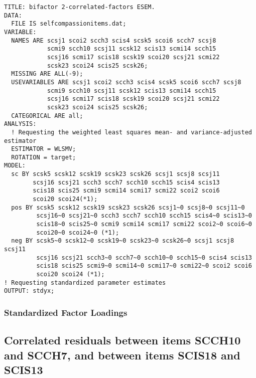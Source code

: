 \documentclass[aps,floatfix,prl]{revtex4}
\begin{document}
\begin{verbatim}
TITLE: bifactor 2-correlated-factors ESEM.
DATA:
  FILE IS selfcompassionitems.dat;
VARIABLE:
  NAMES ARE scsj1 scoi2 scch3 scis4 scsk5 scoi6 scch7 scsj8
            scmi9 scch10 scsj11 scsk12 scis13 scmi14 scch15
            scsj16 scmi17 scis18 scsk19 scoi20 scsj21 scmi22
            scsk23 scoi24 scis25 scsk26;
  MISSING ARE ALL(-9);
  USEVARIABLES ARE scsj1 scoi2 scch3 scis4 scsk5 scoi6 scch7 scsj8
            scmi9 scch10 scsj11 scsk12 scis13 scmi14 scch15
            scsj16 scmi17 scis18 scsk19 scoi20 scsj21 scmi22
            scsk23 scoi24 scis25 scsk26;
  CATEGORICAL ARE all;
ANALYSIS:
  ! Requesting the weighted least squares mean- and variance-adjusted estimator
  ESTIMATOR = WLSMV;
  ROTATION = target;
MODEL:
  sc BY scsk5 scsk12 scsk19 scsk23 scsk26 scsj1 scsj8 scsj11
        scsj16 scsj21 scch3 scch7 scch10 scch15 scis4 scis13
        scis18 scis25 scmi9 scmi14 scmi17 scmi22 scoi2 scoi6
        scoi20 scoi24(*1);
  pos BY scsk5 scsk12 scsk19 scsk23 scsk26 scsj1~0 scsj8~0 scsj11~0
         scsj16~0 scsj21~0 scch3 scch7 scch10 scch15 scis4~0 scis13~0
         scis18~0 scis25~0 scmi9 scmi14 scmi17 scmi22 scoi2~0 scoi6~0
         scoi20~0 scoi24~0 (*1);
  neg BY scsk5~0 scsk12~0 scsk19~0 scsk23~0 scsk26~0 scsj1 scsj8 scsj11
         scsj16 scsj21 scch3~0 scch7~0 scch10~0 scch15~0 scis4 scis13
         scis18 scis25 scmi9~0 scmi14~0 scmi17~0 scmi22~0 scoi2 scoi6
         scoi20 scoi24 (*1);
! Requesting standardized parameter estimates
OUTPUT: stdyx;
\end{verbatim}

\newpage

\hypertarget{standardized-factor-loadings-2}{%
\subsubsection{Standardized Factor
Loadings}\label{standardized-factor-loadings-2}}



\newpage

\hypertarget{correlated-residuals-between-items-scch10-and-scch7-and-between-items-scis18-and-scis13}{%
\subsection{Correlated residuals between items SCCH10 and SCCH7, and
between items SCIS18 and
SCIS13}\label{correlated-residuals-between-items-scch10-and-scch7-and-between-items-scis18-and-scis13}}
\end{document}
